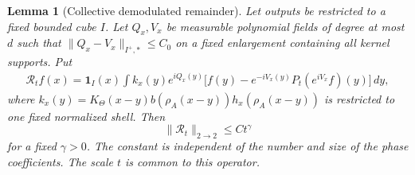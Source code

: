 \documentclass[11pt]{article}
\numberwithin{equation}{section}
\newtheorem{lemma}[theorem]{Lemma}
\theoremstyle{remark}
\theoremstyle{definition}
\begin{document}
\begin{lemma}[Collective demodulated remainder]\label{mod:collective-remainder}
Let outputs be restricted to a fixed bounded cube $I$. Let $Q_x,V_x$
be measurable polynomial fields of degree at most $d$ such that
$\|Q_x-V_x\|_{I^+,*}\le C_0$ on a fixed enlargement containing all kernel
supports. Put
\begin{align*}
 \mathcal R_tf(x)=\mathbf1_I(x)\int k_x(y)e^{iQ_x(y)}
 \bigl[f(y)-e^{-iV_x(y)}P_t(e^{iV_x}f)(y)\bigr]\,dy,
\end{align*}
where $k_x(y)=K_\Theta(x-y)b(\rho_A(x-y))h_x(\rho_A(x-y))$ is restricted to one fixed
normalized shell. Then
\begin{equation}\label{mod:collective-remainder-eq}
 \|\mathcal R_t\|_{2\to2}\le Ct^\gamma
\end{equation}
for a fixed $\gamma>0$. The constant is independent of the number and
size of the phase coefficients. The scale $t$ is common to this operator.
\end{lemma}
\end{document}
